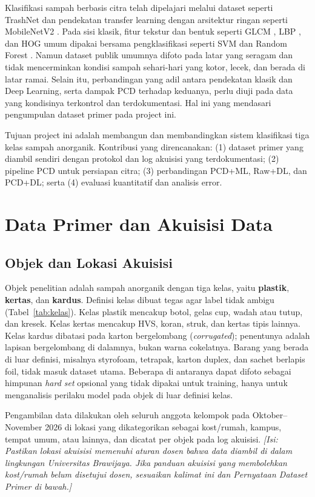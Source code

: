 \documentclass[10pt,twocolumn,a4paper]{article}
\newcommand{\isian}[1]{\textcolor{notegray}{\textit{[Isi: #1]}}}
\begin{document}
Klasifikasi sampah berbasis citra telah dipelajari melalui dataset seperti TrashNet \cite{yang2016trashnet} dan pendekatan transfer learning dengan arsitektur ringan seperti MobileNetV2 \cite{sandler2018mobilenetv2}. Pada sisi klasik, fitur tekstur dan bentuk seperti GLCM \cite{haralick1973}, LBP \cite{ojala2002}, dan HOG \cite{dalal2005} umum dipakai bersama pengklasifikasi seperti SVM \cite{cortes1995} dan Random Forest \cite{breiman2001}. Namun dataset publik umumnya difoto pada latar yang seragam dan tidak mencerminkan kondisi sampah sehari-hari yang kotor, lecek, dan berada di latar ramai. Selain itu, perbandingan yang adil antara pendekatan klasik dan Deep Learning, serta dampak PCD terhadap keduanya, perlu diuji pada data yang kondisinya terkontrol dan terdokumentasi. Hal ini yang mendasari pengumpulan dataset primer pada project ini.

Tujuan project ini adalah membangun dan membandingkan sistem klasifikasi tiga kelas sampah anorganik. Kontribusi yang direncanakan: (1) dataset primer yang diambil sendiri dengan protokol dan log akuisisi yang terdokumentasi; (2) pipeline PCD untuk persiapan citra; (3) perbandingan PCD+ML, Raw+DL, dan PCD+DL; serta (4) evaluasi kuantitatif dan analisis error.

\section{Data Primer dan Akuisisi Data}
\subsection{Objek dan Lokasi Akuisisi}
Objek penelitian adalah sampah anorganik dengan tiga kelas, yaitu \textbf{plastik}, \textbf{kertas}, dan \textbf{kardus}. Definisi kelas dibuat tegas agar label tidak ambigu (Tabel~\ref{tab:kelas}). Kelas plastik mencakup botol, gelas cup, wadah atau tutup, dan kresek. Kelas kertas mencakup HVS, koran, struk, dan kertas tipis lainnya. Kelas kardus dibatasi pada karton bergelombang (\textit{corrugated}); penentunya adalah lapisan bergelombang di dalamnya, bukan warna cokelatnya. Barang yang berada di luar definisi, misalnya styrofoam, tetrapak, karton duplex, dan sachet berlapis foil, tidak masuk dataset utama. Beberapa di antaranya dapat difoto sebagai himpunan \textit{hard set} opsional yang tidak dipakai untuk training, hanya untuk menganalisis perilaku model pada objek di luar definisi kelas.

Pengambilan data dilakukan oleh seluruh anggota kelompok pada Oktober--November 2026 di lokasi yang dikategorikan sebagai kost/rumah, kampus, tempat umum, atau lainnya, dan dicatat per objek pada log akuisisi. \isian{Pastikan lokasi akuisisi memenuhi aturan dosen bahwa data diambil di dalam lingkungan Universitas Brawijaya. Jika panduan akuisisi yang membolehkan kost/rumah belum disetujui dosen, sesuaikan kalimat ini dan Pernyataan Dataset Primer di bawah.}
\end{document}
